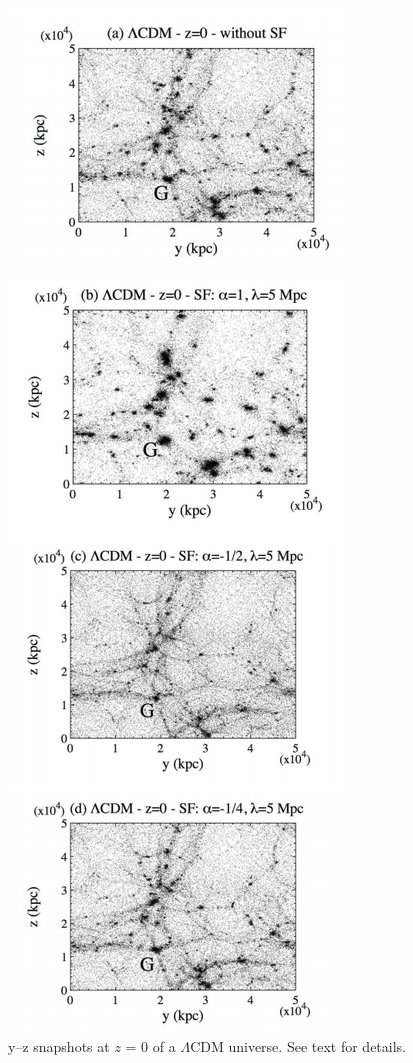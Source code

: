 \documentclass[10pt,journal]{IEEEtran}
\begin{document}
\begin{figure}[H]
    \centering
    \includegraphics[scale=0.5]{img/alma 1.png}
    \caption{ y–z snapshots at $z$ = 0 of a $\Lambda$CDM universe. See text
for details.}
    \label{f:1}
\end{figure}
\end{document}
